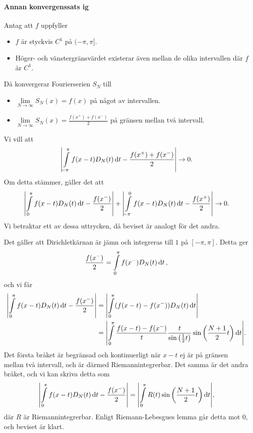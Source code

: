 \paragraph{Annan konvergenssats ig}
Antag att $f$ uppfyller
\begin{itemize}
	\item $f$ är styckvis $C^{1}$ på $(-\pi, \pi]$.
	\item Höger- och vänstergränsvärdet existerar även mellan de olika intervallen där $f$ är $C^{1}$.
\end{itemize}
Då konvergerar Fourierserien $S_{N}$ till
\begin{itemize}
	\item $\lim\limits_{N\to\infty}S_{N}(x) = f(x)$ på något av intervallen.
	\item $\lim\limits_{N\to\infty}S_{N}(x) = \frac{f(x^{+}) + f(x^{-})}{2}$ på gränsen mellan två intervall.
\end{itemize}

\proof
Vi vill att
\begin{align*}
	\abs{\int\limits_{-\pi}^{\pi}f(x - t)D_{N}(t)\dd{t} - \frac{f(x^{+}) + f(x^{-})}{2}}\to 0.
\end{align*}
Om detta stämmer, gäller det att
\begin{align*}
	\abs{\int\limits_{0}^{\pi}f(x - t)D_{N}(t)\dd{t} - \frac{f(x^{-})}{2}} + \abs{\int\limits_{-\pi}^{0}f(x - t)D_{N}(t)\dd{t} - \frac{f(x^{+})}{2}} \to 0.
\end{align*}
Vi betraktar ett av dessa uttrycken, då beviset är analogt för det andra.

Det gäller att Dirichletkärnan är jämn och integreras till $1$ på $[-\pi, \pi]$. Detta ger
\begin{align*}
	\frac{f(x^{-})}{2} = \int\limits_{0}^{\pi}f(x^{-})D_{N}(t)\dd{t},
\end{align*}
och vi får
\begin{align*}
	\abs{\int\limits_{0}^{\pi}f(x - t)D_{N}(t)\dd{t} - \frac{f(x^{-})}{2}} &= \abs{\int\limits_{0}^{\pi}(f(x - t) - f(x^{-}))D_{N}(t)\dd{t}} \\
	                                                                 &= \abs{\int\limits_{0}^{\pi}\frac{f(x - t) - f(x^{-})}{t}\frac{t}{\sin{\left(\frac{1}{2}t\right)}}\sin{\left(\frac{N + 1}{2}t\right)}\dd{t}}.
\end{align*}
Det första bråket är begränsad och kontinuerligt när $x - t$ ej är på gränsen mellan två intervall, och är därmed Riemannintegrerbar. Det samma är det andra bråket, och vi kan skriva detta som
\begin{align*}
	\abs{\int\limits_{0}^{\pi}f(x - t)D_{N}(t)\dd{t} - \frac{f(x^{-})}{2}} = \abs{\int\limits_{0}^{\pi}R(t)\sin{\left(\frac{N + 1}{2}t\right)}\dd{t}},
\end{align*}
där $R$ är Riemannintegrerbar. Enligt Riemann-Lebesgues lemma går detta mot $0$, och beviset är klart.

